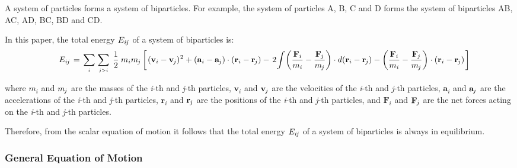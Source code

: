 \documentclass[10pt]{article}
\newcommand{\mM}{m}
\newcommand{\mE}{E}
\newcommand{\ri}{_i}
\newcommand{\vR}{\mathbf{r}}
\newcommand{\vV}{\mathbf{v}}
\newcommand{\vA}{\mathbf{a}}
\newcommand{\vF}{\mathbf{F}}
\newcommand{\He}{\hspace{+1.20em}}
\newcommand{\rj}{_{\hspace{-0.081em}j}}
\newcommand{\rij}{_{i\hspace{-0.081em}j}}
\begin{document}
\vspace{+0.90em}

\par A system of particles forms a system of biparticles. For example, the system of particles A, B, C and D forms the system of biparticles AB, AC, AD, BC, BD and CD.
\medskip
\par In this paper, the total energy $\mE\rij$ of a system of biparticles is:
{\fontsize{6}{6}\selectfont\begin{eqnarray*}
\He \mE\rij \hspace{+0.12em} = \hspace{+0.12em} \sum_{\scriptscriptstyle i} \hspace{+0.12em} \sum_{\scriptscriptstyle j>i} \hspace{+0.24em} \frac{1}{2} \hspace{+0.24em} \mM\ri\mM\rj \left[ \hspace{+0.12em} (\vV\ri - \vV\rj)^{\hspace{+0.03em} 2} + (\vA\ri - \vA\rj) \cdot (\vR\ri - \vR\rj) - \hspace{+0.12em} 2 \hspace{-0.12em} \int \hspace{-0.12em} \left(\frac{\vF\ri}{\mM\ri} - \frac{\vF\rj}{\mM\rj}\right) \cdot d(\vR\ri - \vR\rj) - \left(\frac{\vF\ri}{\mM\ri} - \frac{\vF\rj}{\mM\rj}\right) \cdot (\vR\ri - \vR\rj) \hspace{+0.12em} \right]
\end{eqnarray*}}
\vspace{-0.90em}
\par \noindent where $\mM\ri$ and $\mM\rj$ are the masses of the \textit{i}-th and \textit{j}-th particles, $\vV\ri$ and $\vV\rj$ are the velocities of the \textit{i}-th and \textit{j}-th particles, $\vA\ri$ and $\vA\rj$ are the accelerations of the \textit{i}-th and \textit{j}-th particles, $\vR\ri$ and $\vR\rj$ are the positions of the \textit{i}-th and \textit{j}-th particles, and $\vF\ri$ and $\vF\rj$ are the net forces acting on the \textit{i}-th and \textit{j}-th particles.
\medskip
\par Therefore, from the scalar equation of motion it follows that the total energy $\mE\rij$ of a system of biparticles is always in equilibrium.

\vspace{+1.50em}

{\centering\subsubsection*{General Equation of Motion}}
\end{document}
